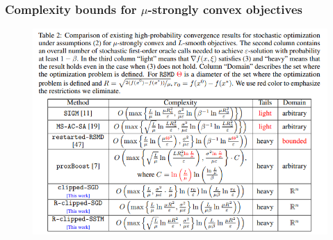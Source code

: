 \begin{frame}
    \frametitle{Complexity bounds for \(\mu\)-strongly convex objectives}
    \begin{figure}[htpb]
        \begin{center}
            \includegraphics[width=0.9\linewidth]
                {pics/appendix/table_2}
        \end{center}
    \end{figure}
\end{frame}

